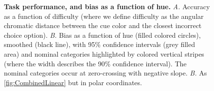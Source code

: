 \begin{figure}
    \centering
        \begin{subfigure}[t]{0.36\textwidth}
         \centering
         \caption{}
         
         \label{fig:CombinedDifficulty}
    \end{subfigure}
    \hfill
    \begin{subfigure}[t]{0.36\textwidth}
         \centering
         \caption{}
         
         \label{fig:CombinedLinear}
    \end{subfigure}
    \hfill
    \begin{subfigure}[t]{0.25\textwidth}
         \centering
         \caption{}
         
         \label{fig:CombinedPolar}
    \end{subfigure}
    \caption{\textbf{Task performance, and bias as a function of hue.}
    \emph{A.} Accuracy as a function of difficulty (where we define difficulty as the angular chromatic distance between the cue color and the closest incorrect choice option).
    \emph{B.} Bias as a function of hue (filled colored circles), smoothed (black line), with 95\% confidence intervals (grey filled area) and nominal categories highlighted by colored vertical stripes (where the width describes the 90\% confidence interval). The nominal categories occur at zero-crossing with negative slope.
    \emph{B.} As \autoref{fig:CombinedLinear} but in polar coordinates.
    }
    \label{fig:AvResults}
\end{figure}

